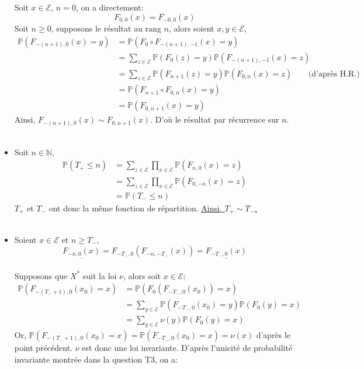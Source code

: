 \documentclass[a4paper,11pt]{article}
\def \P{\mathbb{P}}
\def \E{\mathcal{E}}
\begin{document}
\begin{itemize}
Soit $x \in \E$, $n=0$, on a directement:
\[F_{0,0}(x)=F_{-0,0}(x)\]
Soit $n \geq 0$, supposons le résultat au rang $n$, alors soient $x,y \in \E$,
\begin{equation*}
\begin{split}
\P(F_{-(n+1),0}(x)=y)&=\P(F_0\circ F_{-(n+1),-1}(x)=y)\\
&=\sum_{z \in \E} \P(F_0(z)=y)\P(F_{-(n+1),-1}(x)=z)\\
&=\sum_{z \in \E} \P(F_{n+1}(z)=y)\P(F_{0,n}(x)=z) \quad\quad\text{(d'après H.R.)}\\
&=\P(F_{n+1}\circ F_{0,n}(x)=y)\\
&=\P(F_{0,n+1}(x)=y)
\end{split}
\end{equation*}
Ainsi, $F_{-(n+1),0}(x) \sim F_{0,n+1}(x)$.
D'où le résultat par récurrence sur $n$.\\
\\
\item[\textbullet]
Soit $n \in \mathbb{N}$,
\begin{equation*}
\begin{split}
\P(T_{+}\leq n)&=\sum_{z \in \E} \prod_{x \in \E} \P(F_{n,0}(x)=z)\\
&=\sum_{z \in \E} \prod_{x \in \E} \P(F_{0,-n}(x)=z)\\
&=\P(T_{-}\leq n)
\end{split}
\end{equation*}
$T_+$ et $T_-$ ont donc la même fonction de répartition.
\underline{Ainsi, $T_+ \sim T_-$.}\\
\\
\item[\textbullet]
Soient $x \in \E$ et $n \geq T_-$,
\[\underline{F_{-n,0}(x)}=F_{-T_-,0}(F_{-n,-T_-}(x))=\underline{F_{-T_-,0}(x)}\]\\
Supposons que $X^*$ suit la loi $\nu$, alors soit $x \in \E$:
\begin{equation*}
\begin{split}
\P(F_{-(T_- +1),0}(x_0)=x)&=\P(F_0(F_{-T_-,0}(x_0))=x)\\
&=\sum_{y \in \E}\P(F_{-T_-,0}(x_0)=y)\P(F_0(y)=x)\\
&=\sum_{y \in \E}\nu(y)\P(F_0(y)=x)
\end{split}
\end{equation*}
Or, $\P(F_{-(T_- +1),0}(x_0)=x)=\P(F_{-T_-,0}(x_0)=x)=\nu(x)$ d'après le point précédent.
$\nu$ est donc une loi invariante. D'après l'unicité de probabilité invariante montrée dans la question T3, on a:

\begin{center}
\end{center}

\end{itemize}
\end{document}

